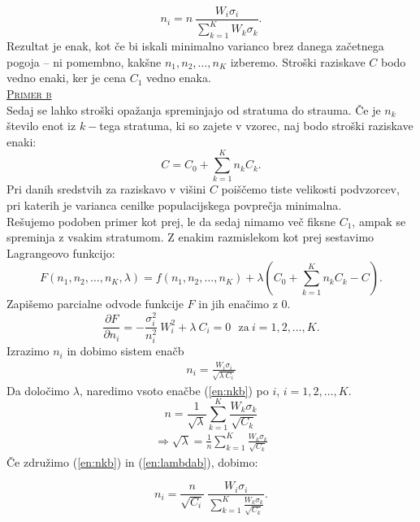 \documentclass[a4paper,12pt]{article}
\begin{document}
$$ n_i = n \ \frac{W_i \sigma_i}{\sum_{k = 1}^{K} W_k \sigma_k}. $$
Rezultat je enak, kot če bi iskali minimalno varianco brez danega začetnega pogoja -- ni pomembno, kakšne $n_1, n_2, \ldots, n_K$ izberemo. Stroški raziskave $C$ bodo vedno enaki, ker je cena $C_1$ vedno enaka.
\\

\noindent
\textsc{\underline{Primer b}}
\\
Sedaj se lahko stroški opažanja spreminjajo od stratuma do strauma. Če je $n_k$ število enot iz $k-$tega stratuma, ki so zajete v vzorec, naj bodo stroški raziskave enaki:
$$ C = C_0 + \sum_{k = 1}^{K}n_k C_k. $$
Pri danih sredstvih za raziskavo v višini $C$ poiščemo tiste velikosti podvzorcev, pri katerih je varianca cenilke populacijskega povprečja minimalna.
\\
Rešujemo podoben primer kot prej, le da sedaj nimamo več fiksne $C_1$, ampak se spreminja z vsakim stratumom. 
Z enakim razmislekom kot prej sestavimo Lagrangeovo funkcijo:
$$ F(n_1, n_2, \ldots, n_K, \lambda) = f(n_1, n_2, \ldots, n_K) + \lambda (C_0 + \sum_{k = 1}^{K} n_k C_k - C). $$
Zapišemo parcialne odvode funkcije $F$ in jih enačimo z $0$.
$$ \frac{ \partial F}{\partial n_i} = - \frac{ \sigma_i^2}{n_i^2} \  W_i^2 + \lambda \ C_i = 0 \ \ \ \text{za} \ i = 1, 2, \ldots, K.  $$
Izrazimo $n_i$ in dobimo sistem enačb
\begin{align}\label{en:nkb}
n_i = \frac{W_i \sigma_i}{ \sqrt{ \lambda \ C_i}}
\end{align}
Da določimo $\lambda$, naredimo vsoto enačbe (\ref{en:nkb}) po $i$, $i = 1, 2, \ldots, K.$
$$ n = \frac{1}{\sqrt{\lambda}} \sum_{k = 1}^{K} \frac{W_k \sigma_k}{\sqrt{C_k}} $$
\begin{align}\label{en:lambdab}
\Rightarrow \sqrt{\lambda} = \frac{1}{n} \sum_{k = 1}^{K} \frac{W_k \sigma_k}{\sqrt{C_k}}
\end{align}
Če združimo (\ref{en:nkb}) in (\ref{en:lambdab}), dobimo:

$$ n_i = \frac{n}{\sqrt{C_i}} \ \frac{W_i \sigma_i}{\sum_{k = 1}^{K} \frac{W_k \sigma_k}{\sqrt{C_k}}}. $$
\\
\end{document}
